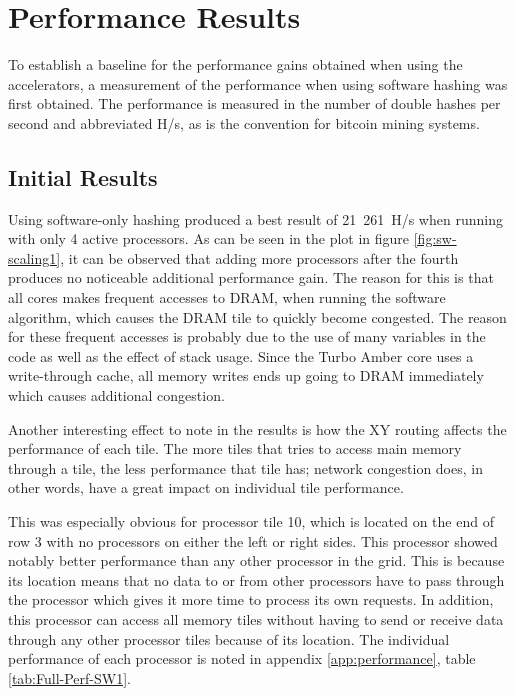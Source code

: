 \section{Performance Results}

To establish a baseline for the performance gains obtained when using the accelerators,
a measurement of the performance when using software hashing was first obtained. The
performance is measured in the number of double hashes per second and abbreviated H/s,
as is the convention for bitcoin mining systems.

\subsection{Initial Results}
\label{sec:init-results}

Using software-only hashing produced a best result of 21~261~H/s when running with only 4 active processors. As can be seen
in the plot in figure \ref{fig:sw-scaling1}, it can be observed that adding more processors after the fourth produces no
noticeable additional performance gain. The reason for this is that all cores makes frequent
accesses to DRAM, when running the software algorithm, which causes the DRAM tile to quickly
become congested. The reason for these frequent accesses is probably due to the use of
many variables in the code as well as the effect of stack usage. Since the Turbo Amber core
uses a write-through cache, all memory writes ends up going to DRAM immediately which causes
additional congestion.

Another interesting effect to note in the results is how the XY routing affects the performance
of each tile. The more tiles that tries to access main memory through a tile, the less
performance that tile has; network congestion does, in other words, have a great impact on individual
tile performance.

This was especially obvious for processor tile 10, which is located on the end of row 3 with no
processors on either the left or right sides. This processor showed notably better performance than
any other processor in the grid. This is because its location means that no data to or from other processors
have to pass through the processor which gives it more time to process its own requests. In addition,
this processor can access all memory tiles without having to send or receive data through any other
processor tiles because of its location. The individual performance of each processor is noted in
appendix \ref{app:performance}, table \ref{tab:Full-Perf-SW1}.

